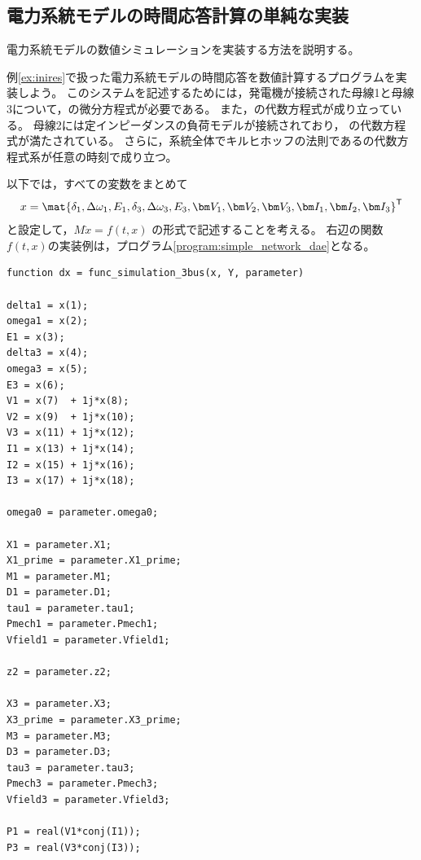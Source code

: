 \documentclass[tombow,dvipdfmx]{corona-a5-1.1}
\begin{document}
\subsection{電力系統モデルの時間応答計算の単純な実装}

電力系統モデルの数値シミュレーションを実装する方法を説明する。

\begin{例}[電力系統のシミュレーションの単純な実装]\label{ex:dae_ex2}
例\ref{ex:inires}で扱った電力系統モデルの時間応答を数値計算するプログラムを実装しよう。
このシステムを記述するためには，発電機が接続された母線1と母線3について，の微分方程式が必要である。
また，の代数方程式が成り立っている。
母線2には定インピーダンスの負荷モデルが接続されており，
の代数方程式が満たされている。
さらに，系統全体でキルヒホッフの法則であるの代数方程式系が任意の時刻で成り立つ。

以下では，すべての変数をまとめて
\begin{align*}
x = \mat{
  \delta_1, \Delta\omega_1, E_1, \delta_3, \Delta\omega_3, E_3, \bm V_1, \bm V_2, \bm V_3, \bm I_1, \bm I_2, \bm I_3
}^{\sf T}
\end{align*}
と設定して，$M\dot{x} = f(t, x)$
の形式で記述することを考える。
右辺の関数$f(t, x)$の実装例は，プログラム\ref{program:simple_network_dae}となる。

\smallskip
\begin{PROGRAMA}[count,title={func\_simulation\_3bus.m}]\label{program:simple_network_dae}
\begin{verbatim}
function dx = func_simulation_3bus(x, Y, parameter)

delta1 = x(1);
omega1 = x(2);
E1 = x(3);
delta3 = x(4);
omega3 = x(5);
E3 = x(6);
V1 = x(7)  + 1j*x(8);
V2 = x(9)  + 1j*x(10);
V3 = x(11) + 1j*x(12);
I1 = x(13) + 1j*x(14);
I2 = x(15) + 1j*x(16);
I3 = x(17) + 1j*x(18);

omega0 = parameter.omega0;

X1 = parameter.X1;
X1_prime = parameter.X1_prime;
M1 = parameter.M1;
D1 = parameter.D1;
tau1 = parameter.tau1;
Pmech1 = parameter.Pmech1;
Vfield1 = parameter.Vfield1;

z2 = parameter.z2;

X3 = parameter.X3;
X3_prime = parameter.X3_prime;
M3 = parameter.M3;
D3 = parameter.D3;
tau3 = parameter.tau3;
Pmech3 = parameter.Pmech3;
Vfield3 = parameter.Vfield3;

P1 = real(V1*conj(I1));
P3 = real(V3*conj(I3));


\end{verbatim}
\end{PROGRAMA}
\end{例}
\end{document}
